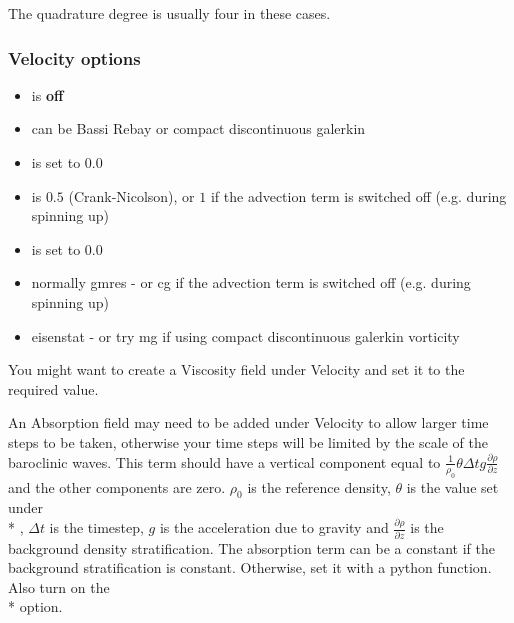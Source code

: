 The quadrature degree is usually four in these cases.

\subsubsection{Velocity options}

\begin{itemize}
\item {} is \textbf{off}
\item {} can be Bassi Rebay or compact discontinuous galerkin
\item {} is set to $0.0$
\item {} is $0.5$ (Crank-Nicolson), or $1$ if the advection term is switched off (e.g. during spinning up)
\item {} is set to $0.0$
\item {} normally gmres - or cg if the advection term is switched off (e.g. during spinning up)
\item {} eisenstat - or try mg if using compact discontinuous galerkin vorticity
\end{itemize}


You might want to create a Viscosity field under Velocity and set it to the required value. 

An Absorption field may need to be added under Velocity to allow larger time steps to be taken, otherwise your time steps will be limited by the scale of the baroclinic waves.  This term should have a vertical component equal to  ${\frac{1}{\rho_0}} {\theta} {\Delta} {t} {g} {\frac{\partial \rho}{\partial z}}$ and the other components are zero. $\rho_0$ is the reference density, $\theta$ is the value set under \\* , ${\Delta} {t} $ is the timestep, $g$ is the acceleration due to gravity and $\frac{\partial \rho}{\partial z}$ is the background density stratification.  The absorption term can be a constant if the background stratification is constant. Otherwise, set it with a python function.  Also turn on the \\*  option.

